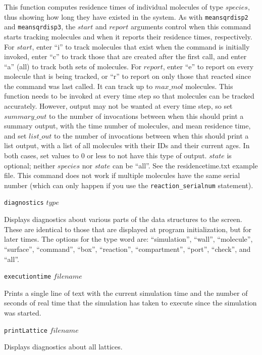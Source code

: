\documentclass {scrbook}
\newcommand {\ttt} {\texttt}
\begin{document}
\begin{description}
This function computes residence times of individual molecules of type $species$, thus showing how long they have existed in the system. As with \ttt{meansqrdisp2} and \ttt{meansqrdisp3}, the $start$ and $report$ arguments control when this command starts tracking molecules and when it reports their residence times, respectively. For $start$, enter ``i'' to track molecules that exist when the command is initially invoked, enter ``c'' to track those that are created after the first call, and enter ``a'' (all) to track both sets of molecules. For $report$, enter ``e'' to report on every molecule that is being tracked, or ``r'' to report on only those that reacted since the command was last called. It can track up to $max\_mol$ molecules. This function needs to be invoked at every time step so that molecules can be tracked accurately. However, output may not be wanted at every time step, so set $summary\_out$ to the number of invocations between when this should print a summary output, with the time number of molecules, and mean residence time, and set $list\_out$ to the number of invocations between when this should print a list output, with a list of all molecules with their IDs and their current ages. In both cases, set values to 0 or less to not have this type of output. $state$ is optional; neither $species$ nor $state$ can be ``all''. See the residencetime.txt example file. This command does not work if multiple molecules have the same serial number (which can only happen if you use the \ttt{reaction\_serialnum} statement).

\item{\ttt{diagnostics} $type$}

Displays diagnostics about various parts of the data structures to the screen. These are identical to those that are displayed at program initialization, but for later times. The options for the type word are: ``simulation'', ``wall'', ``molecule'', ``surface'', ``command'', ``box'', ``reaction'', ``compartment'', ``port'', ``check'', and ``all''.

\item{\ttt{executiontime} $filename$}

Prints a single line of text with the current simulation time and the number of seconds of real time that the simulation has taken to execute since the simulation was started.

\item{\ttt{printLattice} $filename$}

Displays diagnostics about all lattices.


\end{description}
\end{document}
